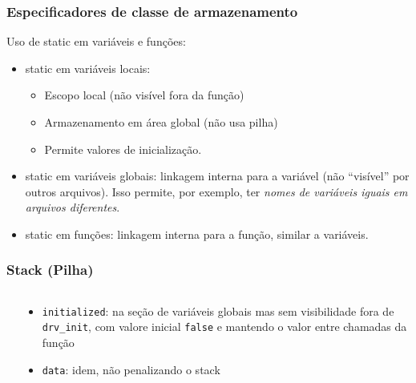 \documentclass{beamer}
\begin{document}
\begin{frame}
	\frametitle{Especificadores de classe de armazenamento}
		Uso de static em variáveis e funções:
	\vspace*{0.5cm}
	\begin{itemize}
	\item static em variáveis locais:
		\begin{itemize}
		\item Escopo local (não visível fora da função)
		\item Armazenamento em área global (não usa pilha)
		\item Permite valores de inicialização.
		\end{itemize}
	\item static em variáveis globais: linkagem interna para a variável (não ``visível'' por outros arquivos).  Isso permite, por exemplo, ter \textit{nomes de variáveis iguais em arquivos diferentes}.
	\item static em funções: linkagem interna para a função, similar a variáveis.
	\end{itemize}
\end{frame}

\begin{frame}
	\frametitle{Stack (Pilha)}
	\begin{columns}[T] %
		\begin{column}{.60\textwidth}
			
		\end{column}%
		\hfill%
        \pause
		\begin{column}{.40\textwidth}
    {\footnotesize
	\begin{itemize}
	\item \texttt{initialized}: na seção de variáveis globais mas sem visibilidade fora de \texttt{drv\_init}, com valore inicial \texttt{false} e mantendo o valor entre chamadas da função
    \item \texttt{data}: idem, não penalizando o stack
	\end{itemize}
    }
		\end{column}%
	\end{columns}
\end{frame}
\end{document}
